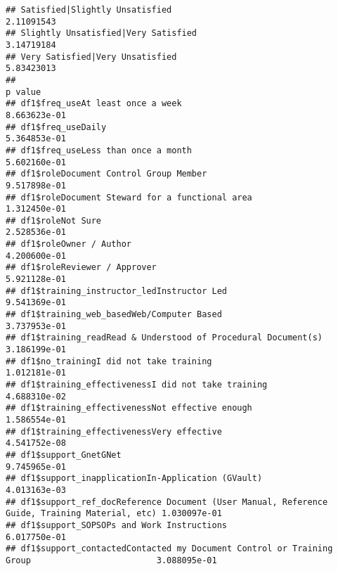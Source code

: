 \documentclass[
]{article}
\begin{document}
\begin{verbatim}
## Satisfied|Slightly Unsatisfied                                                                2.11091543
## Slightly Unsatisfied|Very Satisfied                                                           3.14719184
## Very Satisfied|Very Unsatisfied                                                               5.83423013
##                                                                                                   p value
## df1$freq_useAt least once a week                                                             8.663623e-01
## df1$freq_useDaily                                                                            5.364853e-01
## df1$freq_useLess than once a month                                                           5.602160e-01
## df1$roleDocument Control Group Member                                                        9.517898e-01
## df1$roleDocument Steward for a functional area                                               1.312450e-01
## df1$roleNot Sure                                                                             2.528536e-01
## df1$roleOwner / Author                                                                       4.200600e-01
## df1$roleReviewer / Approver                                                                  5.921128e-01
## df1$training_instructor_ledInstructor Led                                                    9.541369e-01
## df1$training_web_basedWeb/Computer Based                                                     3.737953e-01
## df1$training_readRead & Understood of Procedural Document(s)                                 3.186199e-01
## df1$no_trainingI did not take training                                                       1.012181e-01
## df1$training_effectivenessI did not take training                                            4.688310e-02
## df1$training_effectivenessNot effective enough                                               1.586554e-01
## df1$training_effectivenessVery effective                                                     4.541752e-08
## df1$support_GnetGNet                                                                         9.745965e-01
## df1$support_inapplicationIn-Application (GVault)                                             4.013163e-03
## df1$support_ref_docReference Document (User Manual, Reference Guide, Training Material, etc) 1.030097e-01
## df1$support_SOPSOPs and Work Instructions                                                    6.017750e-01
## df1$support_contactedContacted my Document Control or Training Group                         3.088095e-01

\end{verbatim}
\end{document}
